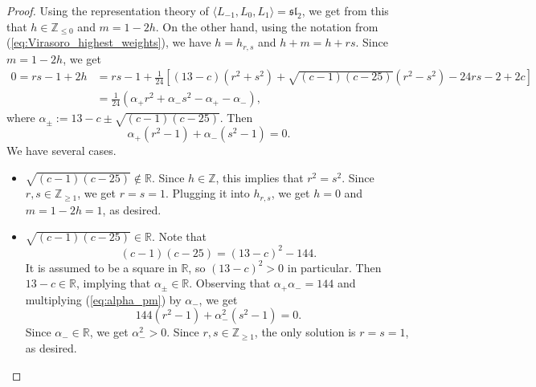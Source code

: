 \documentclass[11pt]{amsart}
\newcommand{\rge}{\rangle}
\newcommand{\lge}{\langle}
\renewcommand{\le}{\leqslant}
\renewcommand{\ge}{\geqslant}
\newcommand{\R}{\mathbb{R}}
\newcommand{\Z}{\mathbb{Z}}
\renewcommand{\sl}{\mathfrak{sl}}
\numberwithin{equation}{section}
\theoremstyle{plain}
\theoremstyle{definition}
\begin{document}
\begin{proof}
    Using the representation theory of $\lge L_{-1},L_0,L_1\rge=\sl_2$, we get from this that $h\in \Z_{\le 0}$ and $m=1-2h$. On the other hand, using the notation from (\ref{eq:Virasoro_highest_weights}), we have $h=h_{r,s}$ and $h+m=h+rs$. Since $m=1-2h$, we get 
    \begin{align*}
        0=rs-1+2h&=rs-1+\frac{1}{24} \left[ (13 - c)(r^2 + s^2) + \sqrt{(c-1)(c-25)} (r^2 - s^2) - 24rs - 2 + 2c \right]\\
        &=\frac{1}{24}(\alpha_+ r^2+\alpha_- s^2-\alpha_+-\alpha_-),
    \end{align*}
    where $\alpha_{\pm}:=13-c\pm\sqrt{(c-1)(c-25)}$. Then
    \begin{equation}\label{eq:alpha_pm}
        \alpha_+(r^2-1)+\alpha_-(s^2-1)=0.
    \end{equation}
    We have several cases. 
    \begin{itemize}
        \item $\sqrt{(c-1)(c-25)}\notin\R$. Since $h\in\Z$, this implies that $r^2=s^2$. Since $r,s\in\Z_{\ge 1}$, we get $r=s=1$. Plugging it into $h_{r,s}$, we get $h=0$ and $m=1-2h=1$, as desired.
        \item $\sqrt{(c-1)(c-25)}\in\R$. Note that 
        $$
        (c-1)(c-25)=(13-c)^2-144.
        $$
        It is assumed to be a square in $\R$, so $(13-c)^2>0$ in particular. Then $13-c\in\R$, implying that $\alpha_{\pm}\in\R$. Observing that $\alpha_+\alpha_-=144$ and multiplying (\ref{eq:alpha_pm})  by $\alpha_-$, we get
        $$
        144(r^2-1)+\alpha_-^2(s^2-1)=0.
        $$
        Since $\alpha_-\in\R$, we get $\alpha_-^2>0$. Since $r,s\in\Z_{\ge 1}$, the only solution is $r=s=1$, as desired.
    \end{itemize}
\end{proof}
\end{document}
